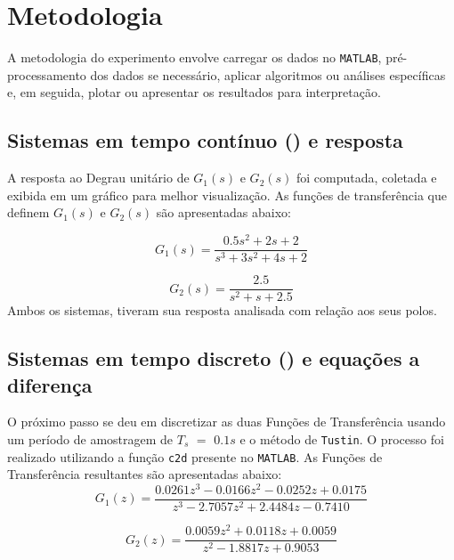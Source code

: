 \documentclass[a4paper,12pt]{article}
\begin{document}
\newpage
\section{Metodologia}

A metodologia do experimento envolve carregar os dados no \texttt{MATLAB}, pré-processamento dos dados se necessário, aplicar algoritmos ou análises específicas e, em seguida, plotar ou apresentar os resultados para interpretação.

\subsection{Sistemas em tempo contínuo () e resposta}\label{3.1}

A resposta ao Degrau unitário de $G_1(s)$ e $G_2(s)$ foi computada, coletada e exibida em um gráfico para melhor visualização. As funções de transferência que definem $G_1(s)$ e $G_2(s)$ são apresentadas abaixo:

\begin{equation*}\label{3.1.1}
G_1(s) = \frac{0.5s^2 + 2s + 2}{s^3 + 3s^2 + 4s + 2} \tag{3.1.1}
\end{equation*}

\begin{equation*}\label{3.1.2}
G_2(s) = \frac{2.5}{s^2 + s + 2.5} \tag{3.1.2}
\end{equation*}
Ambos os sistemas, tiveram sua resposta analisada com relação aos seus polos.

\subsection{Sistemas em tempo discreto () e equações a diferença}\label{3.2}

O próximo passo se deu em discretizar as duas Funções de Transferência usando um período de amostragem de $T_s$ $=$ $0.1s$ e o método de \texttt{Tustin}. O processo foi realizado utilizando a função \texttt{c2d} presente no \texttt{MATLAB}. As Funções de Transferência resultantes são apresentadas abaixo:
\begin{equation*}\label{3.2.1}
G_1(z) = \frac{0.0261z^3 - 0.0166z^2 - 0.0252z + 0.0175}{z^3 - 2.7057z^2 + 2.4484z - 0.7410} \tag{3.2.1}
\end{equation*}

\begin{equation*}\label{3.2.2}
G_2(z) = \frac{0.0059z^2 + 0.0118z + 0.0059}{z^2 - 1.8817z + 0.9053} \tag{3.2.2}
\end{equation*}
\end{document}
